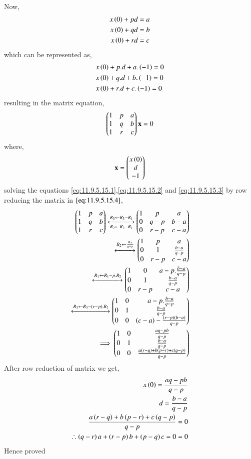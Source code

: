 \documentclass[journal,12pt,onecolumn]{IEEEtran}
\theoremstyle{remark}
\begin{document}
Now,
\begin{align}
    x\left(0\right)+pd &= a \label{eq:11.9.5.15.1} \\
    x\left(0\right)+qd &= b \label{eq:11.9.5.15.2} \\
    x\left(0\right)+rd &= c \label{eq:11.9.5.15.3} 
\end{align}
which can be represented as,
\begin{align}
    &x\left(0\right)+p.d+a.\left(-1\right)=0\\
    &x\left(0\right)+q.d+b.\left(-1\right)=0\\
    &x\left(0\right)+r.d+c.\left(-1\right)=0
\end{align}
resulting in the matrix equation,
\begin{align}
    \begin{pmatrix}1&p&a\\1&q&b\\1&r&c\\\end{pmatrix}\mathbf{x}=0\label{eq:11.9.5.15.4}
\end{align}
where,
\begin{align}
    \mathbf{x}=\begin{pmatrix}x\left(0\right)\\d\\-1\end{pmatrix}
\end{align}
solving the equations \eqref{eq:11.9.5.15.1},\eqref{eq:11.9.5.15.2} and \eqref{eq:11.9.5.15.3} by row reducing the matrix in $\eqref{eq:11.9.5.15.4}$,
    \begin{align}
    \begin{pmatrix}
        1&p&a\\
        1&q&b\\
        1&r&c\\
    \end{pmatrix}
    \xleftrightarrow[R_{2}\leftarrow R_2 - R_1]{ R_{3}\leftarrow R_3 - R_1}
    \begin{pmatrix}
        1&p&a\\
        0&q-p&b-a\\
        0&r-p&c-a\\
    \end{pmatrix}\\
   \xleftrightarrow{R_{2}\leftarrow \frac{R_2}{q-p}} 
    \begin{pmatrix}
        1&p&a\\
        0&1&\frac{b-a}{q-p}\\
        0&r-p&c-a\\
    \end{pmatrix}\\
    \xleftrightarrow{R_1\leftarrow R_1 - p.R_2}
    \begin{pmatrix}
       1&0&a- p. \frac{b-a}{q-p}\\
       0&1&\frac{b-a}{q-p}\\
       0&r-p&c-a\\
    \end{pmatrix}\\
    \xleftrightarrow{R_{3}\leftarrow R_{3}-\ensuremath{\left(r-p\right)}.R_2}
    \begin{pmatrix}
       1&0&a- p. \frac{b-a}{q-p}\\
       0&1&\frac{b-a}{q-p}\\
       0&0&\left(c-a\right) - \frac{\left(r-p\right)\left(b-a\right)}{q-p}\\
    \end{pmatrix}\\
    \implies
    \begin{pmatrix}
          1&0&\frac{aq-pb}{q-p}\\
       0&1&\frac{b-a}{q-p}\\
       0&0&\frac{a\left(r-q\right) + b\left(p-r\right) + c\left(q-p\right)}{q-p}\\
    \end{pmatrix}
\end{align}
After row reduction of matrix we get,
\begin{align}
    x\left(0\right)=\frac{aq-pb}{q-p}\\
    d=\frac{b-a}{q-p}\\
    \frac{a\left(r-q\right) + b\left(p-r\right) + c\left(q-p\right)}{q-p}=0\\
    \therefore{\ensuremath{\left(q-r\right)}a + \ensuremath{\left(r-p\right)}b +\ensuremath{\left(p-q\right)}c =0}=0
\end{align}
Hence proved
\end{document}
